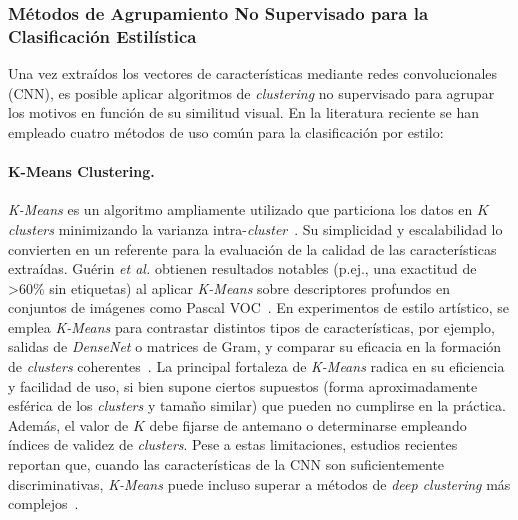 \subsubsection{Métodos de Agrupamiento No Supervisado para la Clasificación Estilística }

Una vez extraídos los vectores de características mediante redes convolucionales (CNN), es posible aplicar algoritmos de \textit{clustering} no supervisado para agrupar los motivos en función de su similitud visual.
En la literatura reciente se han empleado cuatro métodos de uso común para la clasificación por estilo:

\paragraph{K-Means Clustering.}
\textit{K-Means} es un algoritmo ampliamente utilizado que particiona los datos en $K$ \textit{clusters} minimizando la varianza intra-\textit{cluster}~\cite{guerin2018,dangeti2024}.
Su simplicidad y escalabilidad lo convierten en un referente para la evaluación de la calidad de las características extraídas. Guérin \textit{et al.} obtienen resultados notables (p.ej., una exactitud de \textgreater 60\% sin etiquetas) al aplicar \textit{K-Means} sobre descriptores profundos en conjuntos de imágenes como Pascal VOC~\cite{guerin2018}.
En experimentos de estilo artístico, se emplea \textit{K-Means} para contrastar distintos tipos de características, por ejemplo, salidas de \textit{DenseNet} o matrices de Gram, y comparar su eficacia en la formación de \textit{clusters} coherentes~\cite{dangeti2024}.
La principal fortaleza de \textit{K-Means} radica en su eficiencia y facilidad de uso, si bien supone ciertos supuestos (forma aproximadamente esférica de los \textit{clusters} y tamaño similar) que pueden no cumplirse en la práctica.
Además, el valor de $K$ debe fijarse de antemano o determinarse empleando índices de validez de \textit{clusters}.
Pese a estas limitaciones, estudios recientes reportan que, cuando las características de la CNN son suficientemente discriminativas, \textit{K-Means} puede incluso superar a métodos de \textit{deep clustering} más complejos~\cite{dangeti2024}.


